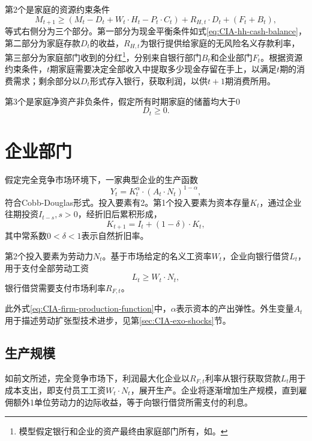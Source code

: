 第2个是家庭的资源约束条件
\begin{equation}
  \label{eq:CIA-hh-rsource-constraint}
  M_{t+1} \ge \left(M_t - D_t + W_t \cdot H_t - P_t \cdot C_t\right) + R_{H,t} \cdot D_t + \left(F_t + B_t\right),
\end{equation}
等式右侧分为三个部分。第一部分为现金平衡条件如式\eqref{eq:CIA-hh-cash-balance}，第二部分为家庭存款$D_t$的收益，$R_{H,t}$为银行提供给家庭的无风险名义存款利率，第三部分为家庭部门收到的分红\footnote{模型假定银行和企业的资产最终由家庭部门所有，如\cite{Christiano:1992fz}。}，分别来自银行部门$B_t$和企业部门$F_t$。根据资源约束条件，$t$期家庭需要决定全部收入中提取多少现金存留在手上，以满足$t$期的消费需求；剩余部分以$D_t$形式存入银行，获取利润，以供$t+1$期消费所用。

第3个是家庭净资产非负条件，假定所有时期家庭的储蓄均大于$0$
\begin{equation}
  \label{eq:CIA-hh-non-negative-deposits-constraint}
  D_t \ge 0.
\end{equation}

\section{企业部门}
假定完全竞争市场环境下，一家典型企业的生产函数
\begin{equation}
  \label{eq:CIA-firm-production-function}
  Y_t = K_t^{\alpha} \cdot (A_t \cdot N_t)^{1-\alpha},
\end{equation}
符合Cobb-Douglas形式。投入要素有2。第1个投入要素为资本存量$K_t$，通过企业往期投资$I_{t-s}, s>0$，经折旧后累积形成，
\begin{equation}
  \label{eq:CIA-firm-capital-accumulation}
  K_{t+1} = I_{t} + (1-\delta) \cdot K_t,
\end{equation}
其中常系数$0<\delta<1$表示自然折旧率。

第2个投入要素为劳动力$N_t$。基于市场给定的名义工资率$W_t$，企业向银行借贷$L_t$，用于支付全部劳动工资
\begin{equation}
  \label{eq:CIA-firm-lending-balance}
  L_t \ge W_t \cdot N_t,
\end{equation}
银行借贷需要支付市场利率$R_{F,t}$。

此外式\eqref{eq:CIA-firm-production-function}中，$\alpha$表示资本的产出弹性。外生变量$A_t$用于描述劳动扩张型技术进步，见第\ref{sec:CIA-exo-shocks}节。

\subsection{生产规模}
如前文所述，完全竞争市场下，利润最大化企业以$R_{F,t}$利率从银行获取贷款$L_t$用于成本支出，即支付员工工资$W_t \cdot N_t$，展开生产。企业将逐渐增加生产规模，直到雇佣额外1单位劳动力的边际收益，等于向银行借贷所需支付的利息。

